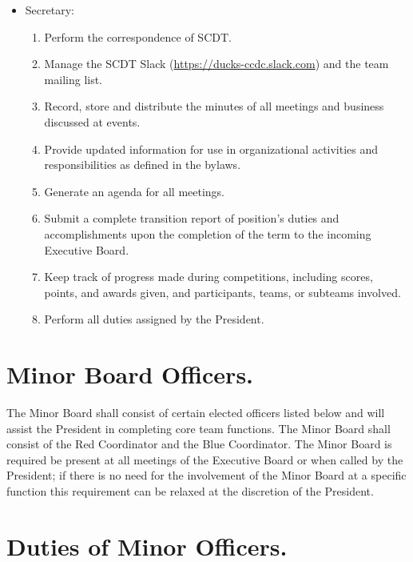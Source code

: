\documentclass[12pt]{constitution}
\begin{document}
\begin{itemize}
\item Secretary:
  \begin{enumerate}
  \item Perform the correspondence of SCDT.
  \item Manage the SCDT Slack (\url{https://ducks-ccdc.slack.com}) and
    the team mailing list.
  \item Record, store and distribute the minutes of all meetings and
    business discussed at events.
  \item Provide updated information for use in organizational
    activities and responsibilities as defined in the bylaws.
  \item Generate an agenda for all meetings.
  \item Submit a complete transition report of position’s duties and
    accomplishments upon the completion of the term to the incoming
    Executive Board.
  \item Keep track of progress made during competitions, including
    scores, points, and awards given, and participants, teams, or
    subteams involved.
  \item Perform all duties assigned by the President.
  \end{enumerate}
\end{itemize}

\section{Minor Board Officers.}\label{sec:MINOR-OFFICERS}

The Minor Board shall consist of certain elected officers listed below and
will assist the President in completing core team functions. The Minor Board
shall consist of the Red Coordinator and the Blue Coordinator. The Minor
Board is required be present at all meetings of the Executive Board or when
called by the President; if there is no need for the involvement of the Minor
Board at a specific function this requirement can be relaxed at the discretion
of the President.

\section{Duties of Minor Officers.}\label{sec:MINOR-DUTIES}
\end{document}
